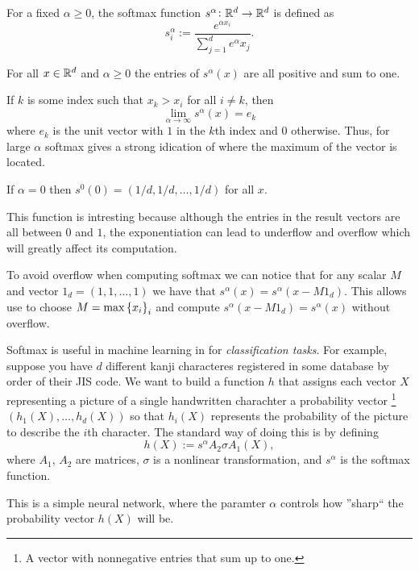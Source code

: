 \documentclass[11pt,a4paper]{article}
\begin{document}
\begin{definition}
  For a fixed $\alpha \geq 0$, the softmax function 
  $s^{\alpha} \colon \mathbb{R}^d \to \mathbb{R}^d$ is defined as
  \[
    s^{\alpha}_i := \frac{e^{\alpha x_i}}{\sum_{j=1}^{d} e^{\alpha} x_j}.
  \]
\end{definition}
\begin{remark}
  For all $x \in \mathbb{R}^d$ and $\alpha \geq 0$ the entries of $s^{\alpha}(x)$
  are all positive and sum to one.
\end{remark}
\begin{remark}
  If $k$ is some index such that $x_k > x_i$ for all $i \neq k$, then
  \[
    \lim_{\alpha \to \infty} s^{\alpha}(x) = e_k
  \]
  where $e_k$ is the unit vector with $1$ in the $k$th index and $0$ otherwise.
  Thus, for large $\alpha$ softmax gives a strong idication of where the
  maximum of the vector is located.
\end{remark}
\begin{remark}
  If $\alpha = 0$ then $s^0(0) = (1/d, 1/d, \dots, 1/d)$ for all $x$.
\end{remark}

This function is intresting because although the entries in the result vectors
are all between $0$ and $1$, the exponentiation can lead to underflow and
overflow which will greatly affect its computation.

To avoid overflow when computing softmax we can notice that for any scalar
$M$ and vector $1_d = (1, 1, \dots, 1)$ we have that 
$s^{\alpha}(x) = s^{\alpha}(x - M 1_d)$.
This allows use to choose $M = \max\left\{x_i\right\}_i$ and compute
$s^{\alpha}(x - M 1_d) = s^{\alpha}(x)$ without overflow.

Softmax is useful in machine learning in for \textit{classification tasks}.
For example, suppose you have $d$ different kanji characteres registered in
some database by order of their JIS code.
We want to build a function $h$ that assigns each vector $X$ representing a
picture of a single handwritten charachter a probability vector
\footnote{A vector with nonnegative entries that sum up to one.}
$(h_1(X),\dots,h_d(X))$ so that $h_i(X)$ represents the probability
of the picture to describe the $i$th character.
The standard way of doing this is by defining
\[
  h(X) := s^{\alpha} A_2 \sigma A_1 (X),
\]
where $A_1$, $A_2$ are matrices, $\sigma$ is a nonlinear transformation,
and $s^{\alpha}$ is the softmax function.

This is a simple neural network, where the paramter $\alpha$ controls how
''sharp`` the probability vector $h(X)$ will be.
\end{document}
